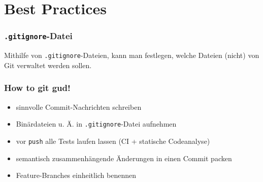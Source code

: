 \documentclass[accentcolor=tud8b,colorbacktitle,inverttitle,landscape,german,presentation,t]{tudbeamer}
\begin{document}
		
		
	\section{Best Practices}

			\begin{frame}
				\frametitle{\texttt{.gitignore}-Datei}
				Mithilfe von \texttt{.gitignore}-Dateien, kann man festlegen, welche Dateien (nicht) von Git verwaltet werden sollen.
				
			\end{frame}
			
			\begin{frame}
				\frametitle{How to git gud!}
					\begin{itemize}
						\item sinnvolle Commit-Nachrichten schreiben
						\item Binärdateien u. Ä. in \texttt{.gitignore}-Datei aufnehmen
						\item vor \texttt{push} alle Tests laufen lassen (CI + statische Codeanalyse)
						\item semantisch zusammenhängende Änderungen in einen Commit packen
						\item Feature-Branches einheitlich benennen
					\end{itemize}
			\end{frame}
			
		
\end{document}
